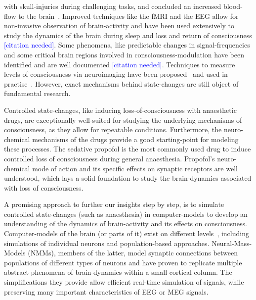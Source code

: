 with skull-injuries during challenging tasks,
and concluded an increased blood-flow to the brain~\cite{mosso_ueber_1881}.
Improved techniques like the fMRI and the EEG allow for non-invasive observation of brain-activity and have been
used extensively to study the dynamics of the brain during sleep and loss and return of consciousness
\textcolor{blue}{[citation needed]}.
Some phenomena, like predictable changes in signal-frequencies and some critical brain regions involved in
consciousness-modulation have been identified and are well documented \textcolor{blue}{[citation needed]}.
Techniques to measure levels of consciousness via neuroimaging have been proposed~\cite{sigl_introduction_1994,
    casali_theoretically_2013} and used in practise~\cite{mathur_bispectral_2022}.
However, exact mechanisms behind state-changes are still object of fundamental research.

Controlled state-changes, like inducing loss-of-consciousness with anaesthetic drugs,
are exceptionally well-suited for studying the underlying mechanisms of consciousness,
as they allow for repeatable conditions.
Furthermore, the neuro-chemical mechanisms of the drugs provide a good starting-point for modeling these processes.
The sedative propofol is the most commonly used drug to induce controlled loss of consciousness
during general anaesthesia.
Propofol's neuro-chemical mode of action and its specific effects on synaptic receptors are well understood,
which lays a solid foundation to study the brain-dynamics associated with loss of consciousness.

A promising approach to further our insights step by step, is to simulate controlled state-changes
(such as anaesthesia) in computer-models to develop an understanding of the dynamics of brain-activity and its
effects on consciousness. %
Computer-models of the brain (or parts of it) exist on different levels~\cite{panahi_generative_2021},
including simulations of individual neurons and population-based approaches.
Neural-Mass-Models (NMMs), members of the latter, model synaptic connections between populations of different types
of neurons and have proven to replicate multiple abstract phenomena of brain-dynamics\cite{bojak_neural_2014,
    knösche_jansen-rit_2014} within a small cortical
column.
The simplifications they provide allow efficient real-time simulation of signals,
while preserving many important characteristics of EEG or MEG signals.

